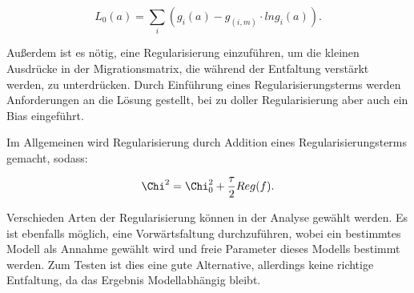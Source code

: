 \begin{equation}
 L_0(a)=\sum_i (g_i(a)-g_(i,m)\cdot ln g_i(a)).
\end{equation}

Außerdem ist es nötig, eine Regularisierung einzuführen, um die kleinen Ausdrücke in der Migrationsmatrix, die während der Entfaltung verstärkt werden, zu unterdrücken.
Durch Einführung eines Regularisierungsterms werden Anforderungen an die Lösung gestellt, bei zu doller Regularisierung aber auch ein Bias eingeführt.

Im Allgemeinen wird Regularisierung durch Addition eines Regularisierungsterms gemacht, sodass:

\begin{equation}
 \Chi^2=\Chi_0^2 +\frac{\tau}{2} Reg(f).
\end{equation}

Verschieden Arten der Regularisierung können in der Analyse gewählt werden.
Es ist ebenfalls möglich, eine Vorwärtsfaltung durchzuführen, wobei ein bestimmtes Modell als Annahme gewählt wird und freie Parameter dieses Modells bestimmt werden.
Zum Testen ist dies eine gute Alternative, allerdings keine richtige Entfaltung, da das Ergebnis Modellabhängig bleibt.



